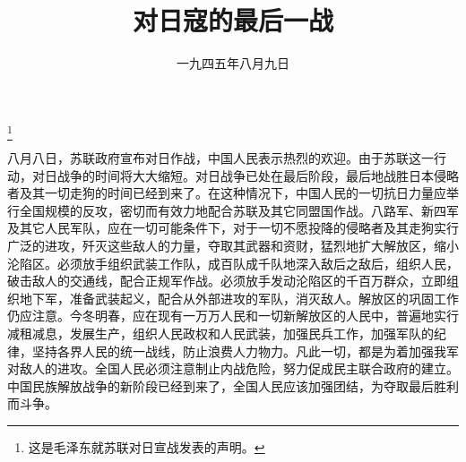 
\title{对日寇的最后一战}
\date{一九四五年八月九日}
\thanks{这是毛泽东就苏联对日宣战发表的声明。}
\maketitle


八月八日，苏联政府宣布对日作战，中国人民表示热烈的欢迎。由于苏联这一行动，对日战争的时间将大大缩短。对日战争已处在最后阶段，最后地战胜日本侵略者及其一切走狗的时间已经到来了。在这种情况下，中国人民的一切抗日力量应举行全国规模的反攻，密切而有效力地配合苏联及其它同盟国作战。八路军、新四军及其它人民军队，应在一切可能条件下，对于一切不愿投降的侵略者及其走狗实行广泛的进攻，歼灭这些敌人的力量，夺取其武器和资财，猛烈地扩大解放区，缩小沦陷区。必须放手组织武装工作队，成百队成千队地深入敌后之敌后，组织人民，破击敌人的交通线，配合正规军作战。必须放手发动沦陷区的千百万群众，立即组织地下军，准备武装起义，配合从外部进攻的军队，消灭敌人。解放区的巩固工作仍应注意。今冬明春，应在现有一万万人民和一切新解放区的人民中，普遍地实行减租减息，发展生产，组织人民政权和人民武装，加强民兵工作，加强军队的纪律，坚持各界人民的统一战线，防止浪费人力物力。凡此一切，都是为着加强我军对敌人的进攻。全国人民必须注意制止内战危险，努力促成民主联合政府的建立。中国民族解放战争的新阶段已经到来了，全国人民应该加强团结，为夺取最后胜利而斗争。
